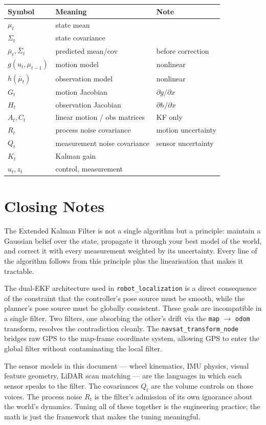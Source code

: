 \documentclass[11pt,a4paper]{article}
\begin{document}
\begin{center}
\begin{tabular}{lll}
\toprule
\textbf{Symbol} & \textbf{Meaning} & \textbf{Note}\\
\midrule
$\mu_t$ & state mean & \\
$\Sigma_t$ & state covariance & \\
$\bar{\mu}_t, \bar{\Sigma}_t$ & predicted mean/cov & before correction \\
$g(u_t, \mu_{t-1})$ & motion model & nonlinear \\
$h(\bar{\mu}_t)$ & observation model & nonlinear \\
$G_t$ & motion Jacobian & $\partial g / \partial x$ \\
$H_t$ & observation Jacobian & $\partial h / \partial x$ \\
$A_t, C_t$ & linear motion / obs matrices & KF only \\
$R_t$ & process noise covariance & motion uncertainty \\
$Q_t$ & measurement noise covariance & sensor uncertainty \\
$K_t$ & Kalman gain & \\
$u_t, z_t$ & control, measurement & \\
\bottomrule
\end{tabular}
\end{center}

\section*{Closing Notes}

The Extended Kalman Filter is not a single algorithm but a principle: maintain a Gaussian belief over the state, propagate it through your best model of the world, and correct it with every measurement weighted by its uncertainty. Every line of the algorithm follows from this principle plus the linearisation that makes it tractable.

The dual-EKF architecture used in \texttt{robot\_localization} is a direct consequence of the constraint that the controller's pose source must be smooth, while the planner's pose source must be globally consistent. These goals are incompatible in a single filter. Two filters, one absorbing the other's drift via the \texttt{map} $\to$ \texttt{odom} transform, resolves the contradiction cleanly. The \texttt{navsat\_transform\_node} bridges raw GPS to the map-frame coordinate system, allowing GPS to enter the global filter without contaminating the local filter.

The sensor models in this document --- wheel kinematics, IMU physics, visual feature geometry, LiDAR scan matching --- are the languages in which each sensor speaks to the filter. The covariances $Q_t$ are the volume controls on those voices. The process noise $R_t$ is the filter's admission of its own ignorance about the world's dynamics. Tuning all of these together is the engineering practice; the math is just the framework that makes the tuning meaningful.
\end{document}
